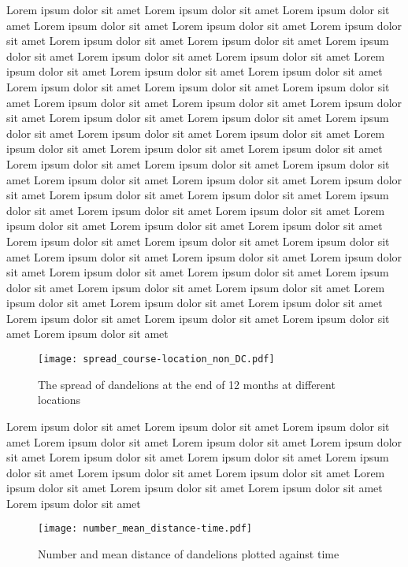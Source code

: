 \documentclass[12pt]{article}
\begin{document}
			Lorem ipsum dolor sit amet Lorem ipsum dolor sit amet Lorem ipsum dolor sit amet Lorem ipsum dolor sit amet Lorem ipsum dolor sit amet Lorem ipsum dolor sit amet Lorem ipsum dolor sit amet Lorem ipsum dolor sit amet Lorem ipsum dolor sit amet Lorem ipsum dolor sit amet Lorem ipsum dolor sit amet Lorem ipsum dolor sit amet Lorem ipsum dolor sit amet Lorem ipsum dolor sit amet Lorem ipsum dolor sit amet Lorem ipsum dolor sit amet Lorem ipsum dolor sit amet Lorem ipsum dolor sit amet Lorem ipsum dolor sit amet Lorem ipsum dolor sit amet Lorem ipsum dolor sit amet Lorem ipsum dolor sit amet Lorem ipsum dolor sit amet Lorem ipsum dolor sit amet Lorem ipsum dolor sit amet Lorem ipsum dolor sit amet Lorem ipsum dolor sit amet Lorem ipsum dolor sit amet Lorem ipsum dolor sit amet Lorem ipsum dolor sit amet Lorem ipsum dolor sit amet Lorem ipsum dolor sit amet Lorem ipsum dolor sit amet Lorem ipsum dolor sit amet Lorem ipsum dolor sit amet Lorem ipsum dolor sit amet Lorem ipsum dolor sit amet Lorem ipsum dolor sit amet Lorem ipsum dolor sit amet Lorem ipsum dolor sit amet Lorem ipsum dolor sit amet Lorem ipsum dolor sit amet Lorem ipsum dolor sit amet Lorem ipsum dolor sit amet Lorem ipsum dolor sit amet Lorem ipsum dolor sit amet Lorem ipsum dolor sit amet Lorem ipsum dolor sit amet Lorem ipsum dolor sit amet Lorem ipsum dolor sit amet Lorem ipsum dolor sit amet Lorem ipsum dolor sit amet Lorem ipsum dolor sit amet Lorem ipsum dolor sit amet Lorem ipsum dolor sit amet Lorem ipsum dolor sit amet Lorem ipsum dolor sit amet Lorem ipsum dolor sit amet Lorem ipsum dolor sit amet Lorem ipsum dolor sit amet 
			
			\begin{figure}
				\centering
				\texttt{[image: spread\_course-location\_non\_DC.pdf]}
				\caption{The spread of dandelions at the end of 12 months at different locations}
				\label{fig:scatter5loc}
			\end{figure}
			
			Lorem ipsum dolor sit amet Lorem ipsum dolor sit amet Lorem ipsum dolor sit amet Lorem ipsum dolor sit amet Lorem ipsum dolor sit amet Lorem ipsum dolor sit amet Lorem ipsum dolor sit amet Lorem ipsum dolor sit amet Lorem ipsum dolor sit amet Lorem ipsum dolor sit amet Lorem ipsum dolor sit amet Lorem ipsum dolor sit amet Lorem ipsum dolor sit amet Lorem ipsum dolor sit amet Lorem ipsum dolor sit amet
			
					
			\begin{figure}
				\centering
				\texttt{[image: number\_mean\_distance-time.pdf]}
				\caption{Number and mean distance of dandelions plotted against time}
				\label{fig:time}
			\end{figure}
		
\end{document}
